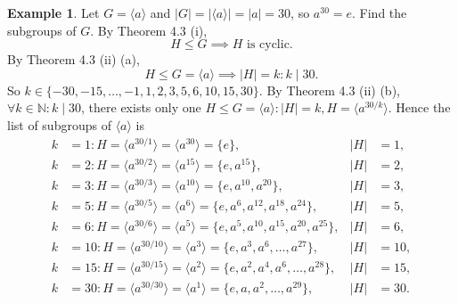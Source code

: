 \documentclass{article}
\newtheorem{corollary}{Corollary}[theorem]
\theoremstyle{definition}
\newtheorem{example}{Example}[section]
\begin{document}
\begin{example}
    Let $G=\langle a \rangle$ and $|G|=|\langle a \rangle|=|a|=30$, so $a^{30}=e$. Find the subgroups of $G$. By Theorem 4.3 (i),
    \begin{equation*}
        H \leq G \implies H \text{ is cyclic.}
    \end{equation*}
    By Theorem 4.3 (ii) (a),
    \begin{equation*}
        H \leq G = \langle a \rangle \implies |H|=k: k \mid 30.
    \end{equation*}
    So $k \in \{-30,-15,\dots,-1,1,2,3,5,6,10,15,30\}$. By Theorem 4.3 (ii) (b), $\forall k \in \mathbb{N}: k \mid 30$, there exists only one $H \leq G = \langle a \rangle : |H|=k, H=\langle a^{30/k} \rangle$. Hence the list of subgroups of $\langle a \rangle$ is
    \begin{align*}
        k &= 1: H=\langle a^{30/1} \rangle = \langle a^{30} \rangle = \{e\}, & |H| &= 1, \\
        k &= 2: H=\langle a^{30/2} \rangle = \langle a^{15} \rangle = \{e,a^{15}\}, & |H| &= 2, \\
        k &= 3: H=\langle a^{30/3} \rangle = \langle a^{10} \rangle = \{e,a^{10},a^{20}\}, & |H| &= 3, \\
        k &= 5: H = \langle a^{30/5} \rangle = \langle a^{6} \rangle = \{e,a^6,a^{12},a^{18},a^{24}\}, & |H| &= 5, \\
        k &= 6: H=\langle a^{30/6} \rangle = \langle a^{5} \rangle = \{e,a^5,a^{10},a^{15},a^{20},a^{25}\}, & |H| &= 6, \\
        k &= 10: H=\langle a^{30/10} \rangle = \langle a^3 \rangle = \{e,a^3,a^6,\dots,a^{27}\}, & |H| &= 10, \\
        k &= 15: H=\langle a^{30/15} \rangle = \langle a^2 \rangle = \{e,a^2,a^4,a^6,\dots,a^{28}\}, & |H| &= 15, \\
        k &= 30: H=\langle a^{30/30} \rangle = \langle a^1 \rangle = \{e,a,a^2,\dots,a^{29}\}, & |H| &= 30.
    \end{align*}
\end{example}

\noindent{}
\end{document}
